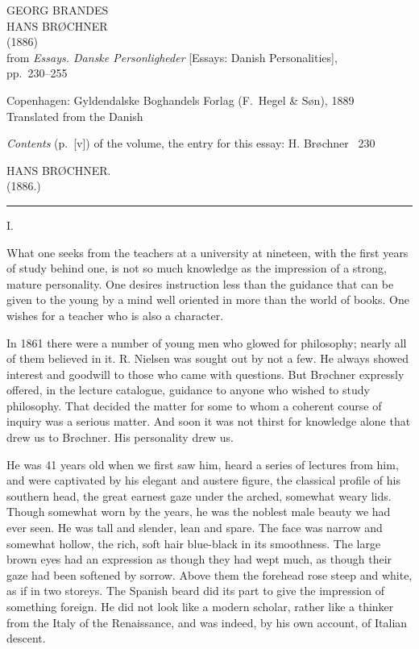 \documentclass[12pt,a4paper,openany]{book}
\newcommand{\opage}[1]{\marginnote{\footnotesize\textit{[#1]}}}
\newcommand{\essaytitle}[2]{\begin{center}{\large #1}\\[4pt]#2\\[4pt]\rule{1.5cm}{0.4pt}\end{center}}
\newcommand{\sectionnum}[1]{\begin{center}#1\end{center}}
\begin{document}
\thispagestyle{empty}
\begin{center}
\vspace*{2cm}
GEORG BRANDES\\[2ex]
{\LARGE HANS BRØCHNER}\\[1ex]
(1886)\\[4ex]
from \textit{Essays. Danske Personligheder} [Essays: Danish Personalities],\\
pp.~230--255\\[\fill]
\end{center}
\vfill
\begin{center}
Copenhagen: Gyldendalske Boghandels Forlag (F.\ Hegel \& Søn), 1889\\[3ex]
{\small Translated from the Danish}
\end{center}
\clearpage
\noindent\textit{Contents} (p.~[v]) of the volume, the entry for this essay: H. Brøchner \dotfill\ 230

\vspace{2em}
\opage{230}\essaytitle{HANS BRØCHNER.}{(1886.)}

\sectionnum{I.}

What one seeks from the teachers at a university at nineteen, with the first
years of study behind one, is not so much knowledge as the impression of a
strong, mature personality. One desires instruction less than the guidance
that can be given to the young by a mind well oriented in more than the world
of books. One wishes for a teacher who is also a character.

In 1861 there were a number of young men who glowed for philosophy; nearly all
of them believed in it. R. Nielsen was sought out by not a few. He always showed
interest and goodwill to those who came with questions. But Brøchner expressly
offered, in the lecture catalogue, guidance to anyone who wished to study
philosophy. That decided the matter for
\opage{231}some to whom a coherent course of inquiry was a serious matter. And soon it
was not thirst for knowledge alone that drew us to Brøchner. His personality
drew us.

He was 41 years old when we first saw him, heard a series of lectures from
him, and were captivated by his elegant and austere figure, the classical
profile of his southern head, the great earnest gaze under the arched,
somewhat weary lids. Though somewhat worn by the years, he was the noblest
male beauty we had ever seen. He was tall and slender, lean and spare. The
face was narrow and somewhat hollow, the rich, soft hair blue-black in its
smoothness. The large brown eyes had an expression as though they had wept
much, as though their gaze had been softened by sorrow. Above them the
forehead rose steep and white, as if in two storeys. The Spanish beard did its
part to give the impression of something foreign. He did not look like a
modern scholar, rather like a thinker from the Italy of the Renaissance, and
was indeed, by his own account, of Italian descent.
\end{document}
